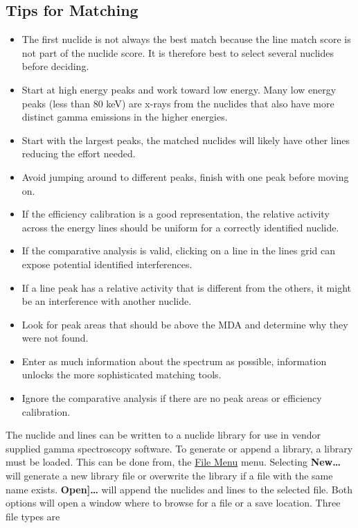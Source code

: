\documentclass[12pt,report,justified]{SANDreport}
\begin{document}
\subsection{Tips for Matching}\label{sec:match_tips}
\begin{itemize}
    \item The first nuclide is not always the best match because the line match score is not part of the nuclide
    score. It is therefore best to select several nuclides before deciding.
    \item Start at high energy peaks and work toward low energy. Many low energy peaks (less than 80 keV) are
    x-rays from the nuclides that also have more distinct gamma emissions in the higher energies.
    \item Start with the largest peaks, the matched nuclides will likely have other lines reducing the effort
    needed.
    \item Avoid jumping around to different peaks, finish with one peak before moving on.
    \item If the efficiency calibration is a good representation, the relative activity across the energy lines
    should be uniform for a correctly identified nuclide.
    \item If the comparative analysis is valid, clicking on a line in the lines grid can expose potential identified
    interferences.
    \item If a line peak has a relative activity that is different from the others, it might be an interference
    with another nuclide.
    \item Look for peak areas that should be above the MDA and determine why they were not found.
    \item Enter as much information about the spectrum as possible, information unlocks the more sophisticated
    matching tools.
    \item Ignore the comparative analysis if there are no peak areas or efficiency calibration.
\end{itemize}
The nuclide and lines can be written to a nuclide library for use in vendor supplied gamma spectroscopy software.
To generate or append a library, a library must be loaded. This can be done from, the
\hyperref[sec:file_menu]{File Menu} menu. Selecting \textbf{New\ldots} will generate a new library file or overwrite
the library if a file with the same name exists. \textbf{Open]\ldots} will append the nuclides and lines to the
selected file. Both options will open a window where to browse for a file or a save location. Three file types are
\end{document}
